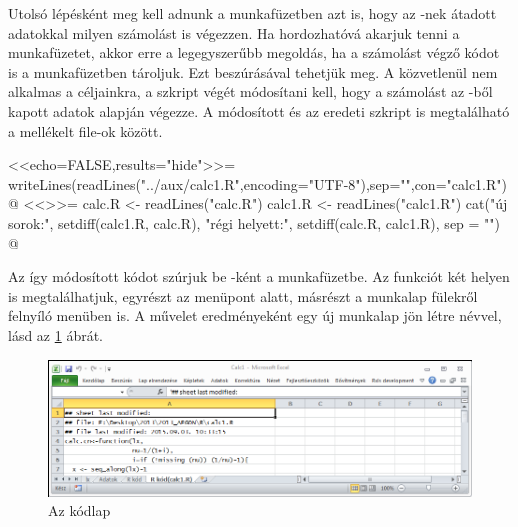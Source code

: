 

Utolsó lépésként meg kell adnunk a  munkafüzetben azt
is, hogy az -nek átadott adatokkal milyen számolást is végezzen. Ha
hordozhatóvá akarjuk tenni a munkafüzetet, akkor erre a legegyszerűbb
megoldás, ha a számolást végző  kódot is a munkafüzetben 
tároljuk. Ezt  beszúrásával tehetjük meg.
A  közvetlenül nem alkalmas a céljainkra, a szkript végét
módosítani kell, hogy a számolást 
az -ből kapott adatok alapján végezze. A módosított és az
eredeti   szkript is megtalálható a 
mellékelt file-ok között.
\begin{Rnw}
<<echo=FALSE,results="hide">>=
writeLines(readLines("../aux/calc1.R",encoding="UTF-8"),sep="\n",con="calc1.R")
@
<<>>=
calc.R <- readLines("calc.R")
calc1.R <- readLines("calc1.R")
cat("új sorok:", setdiff(calc1.R, calc.R), "\ra régi helyett:",
                 setdiff(calc.R, calc1.R), sep = "\n")
@
\end{Rnw}
Az így módosított kódot szúrjuk be -ként a
munkafüzetbe. Az  funkciót két helyen is
megtalálhatjuk, egyrészt az  menüpont alatt,
másrészt a munkalap fülekről felnyíló menüben is. A művelet
eredményeként egy új munkalap jön létre  névvel,
lásd az \ref{fig:1.4} ábrát.
\begin{figure}[h]
  \centering
  \includegraphics{images/R-kod_calc1R}
  \caption{Az  kódlap}
  \label{fig:1.4}
\end{figure}

